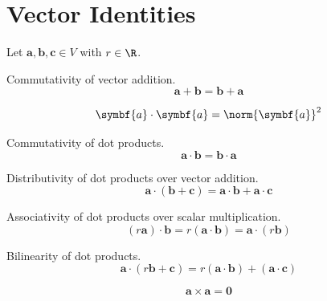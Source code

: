 \documentclass{article}
\begin{document}
\section{Vector Identities}
Let \(\symbf{a}, \symbf{b}, \symbf{c} \in V\) with \(r \in \R\).
\begin{theorem}
    Commutativity of vector addition.
    \begin{equation*}
        \symbf{a} + \symbf{b} = \symbf{b} + \symbf{a}
    \end{equation*}
\end{theorem}
\begin{theorem}
    \begin{equation*}
        \symbf{a}\cdot\symbf{a}=\norm{\symbf{a}}^2
    \end{equation*}
\end{theorem}
\begin{theorem}
    Commutativity of dot products.
    \begin{equation*}
        \symbf{a}\cdot \symbf{b} = \symbf{b}\cdot \symbf{a}
    \end{equation*}
\end{theorem}
\begin{theorem}
    Distributivity of dot products over vector addition.
    \begin{equation*}
        \symbf{a}\cdot \left(\symbf{b}+\symbf{c}\right) = \symbf{a}\cdot\symbf{b} + \symbf{a}\cdot\symbf{c}
    \end{equation*}
\end{theorem}
\begin{theorem}
    Associativity of dot products over scalar multiplication.
    \begin{equation*}
        \left(r\symbf{a}\right)\cdot\symbf{b} = r\left(\symbf{a}\cdot\symbf{b}\right)=\symbf{a}\cdot\left(r\symbf{b}\right)
    \end{equation*}
\end{theorem}
\begin{theorem}
    Bilinearity of dot products.
    \begin{equation*}
        \symbf{a}\cdot\left(r\symbf{b}+\symbf{c}\right)=r\left(\symbf{a}\cdot\symbf{b}\right)+\left(\symbf{a}\cdot\symbf{c}\right)
    \end{equation*}
\end{theorem}
\begin{theorem}
    \begin{equation*}
        \symbf{a}\times \symbf{a} = \symbf{0}
    \end{equation*}
\end{theorem}
\end{document}
